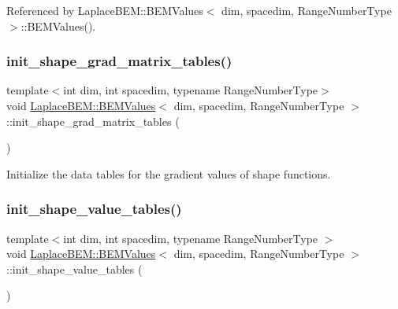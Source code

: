 Referenced by Laplace\+B\+E\+M\+::\+B\+E\+M\+Values$<$ dim, spacedim, Range\+Number\+Type $>$\+::\+B\+E\+M\+Values().

\mbox{\label{classLaplaceBEM_1_1BEMValues_a5646d3caf1ede82b5dca1f82be893dd4}} 
\subsubsection{\texorpdfstring{init\+\_\+shape\+\_\+grad\+\_\+matrix\+\_\+tables()}{init\_shape\_grad\_matrix\_tables()}\hspace{0.1cm}{\footnotesize\ttfamily [2/2]}}
{\footnotesize\ttfamily template$<$int dim, int spacedim, typename Range\+Number\+Type$>$ \\
void \hyperlink{classLaplaceBEM_1_1BEMValues}{Laplace\+B\+E\+M\+::\+B\+E\+M\+Values}$<$ dim, spacedim, Range\+Number\+Type $>$\+::init\+\_\+shape\+\_\+grad\+\_\+matrix\+\_\+tables (\begin{DoxyParamCaption}{ }\end{DoxyParamCaption})\hspace{0.3cm}{\ttfamily [protected]}}

Initialize the data tables for the gradient values of shape functions. \mbox{\label{classLaplaceBEM_1_1BEMValues_a71328aee0f80bcea63897444b086de99}} 
\subsubsection{\texorpdfstring{init\+\_\+shape\+\_\+value\+\_\+tables()}{init\_shape\_value\_tables()}\hspace{0.1cm}{\footnotesize\ttfamily [1/2]}}
{\footnotesize\ttfamily template$<$int dim, int spacedim, typename Range\+Number\+Type $>$ \\
void \hyperlink{classLaplaceBEM_1_1BEMValues}{Laplace\+B\+E\+M\+::\+B\+E\+M\+Values}$<$ dim, spacedim, Range\+Number\+Type $>$\+::init\+\_\+shape\+\_\+value\+\_\+tables (\begin{DoxyParamCaption}{ }\end{DoxyParamCaption})\hspace{0.3cm}{\ttfamily [protected]}}


